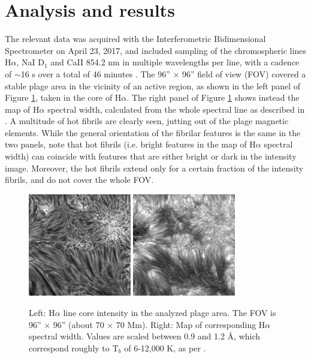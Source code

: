 \documentclass{iau}
\begin{document}
\section{Analysis and results}\label{sec_data}

The relevant data was acquired with the Interferometric Bidimensional Spectrometer \citep[IBIS,][]{2006SoPh..236..415C} on April 23, 2017, and included sampling of the 
chromospheric lines H$\alpha$,
NaI D$_1$ and CaII 854.2 nm in multiple wavelengths per line, with a cadence of $\sim$16 s over a total of 46 minutes  \citep[note that this is the same dataset analyzed in][]{2019ApJ...881...99M,2022ApJ...933..244H}. The 96'' $\times$ 96'' field of view (FOV) covered a stable plage area in the vicinity of an active region, as shown in the left panel of Figure \ref{fig_fov}, taken in the core of H$\alpha$.  The right panel of
Figure  \ref{fig_fov} shows instead the map of H$\alpha$ spectral width, calculated from the whole spectral line as described in \citet{2009A&A...503..577C}. A multitude of hot fibrils are clearly seen, jutting out of the plage magnetic elements. While the general orientation of the fibrilar features is the same in the two panels, note that hot fibrils (i.e. bright features in the map of H$\alpha$ spectral width) can coincide with features that are either bright or dark in the intensity image. Moreover, the hot fibrils extend only for a certain fraction of the intensity fibrils, and do not cover the whole FOV.  

\begin{figure}[h]
\begin{center}
 \includegraphics[width=0.4\textwidth]{fov.int.png} 
 \hspace{0.8cm}
  \includegraphics[width=0.4\textwidth]{fov.width.png} 
 \caption{Left: H$\alpha$ line core intensity in the analyzed plage area. The FOV is 96'' $\times$ 96'' (about 70 $\times$ 70 Mm). Right: Map of corresponding H$\alpha$
 spectral width. Values are scaled between 0.9 and 1.2 \AA, which correspond roughly to T$_b$ of 6-12,000 K, as per \citet{2019ApJ...881...99M}.}\label{fig_fov}
\end{center}
\end{figure}
\end{document}
